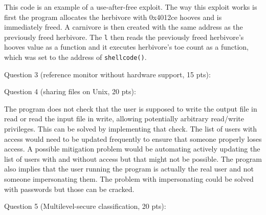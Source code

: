 \documentclass[11pt]{article}
\begin{document}
This code is an example of a use-after-free exploit. The way this exploit works is first the program allocates the herbivore with 0x4012ce hooves and is immediately freed. A carnivore is then created with the same address as the previously freed herbivore. The \verb|l| then reads the previously freed herbivore's hooves value as a function and it executes herbivore's toe count as a function, which was set to the address of \verb|shellcode()|.
\newpage

Question 3 (reference monitor without hardware support, 15 pts):

\newpage

Question 4 (sharing files on Unix, 20 pts):

The program does not check that the user is supposed to write the output file in read or read the input file in write, allowing potentially arbitrary read/write privileges. This can be solved by implementing that check.
The list of users with access would need to be updated frequently to ensure that someone properly loses access. A possible mitigation problem would be automating actively updating the list of users with and without access but that might not be possible.
The program also implies that the user running the program is actually the real user and not someone impersonating them. The problem with impersonating could be solved with passwords but those can be cracked.
\newpage

Question 5 (Multilevel-secure classification, 20 pts):
\end{document}
